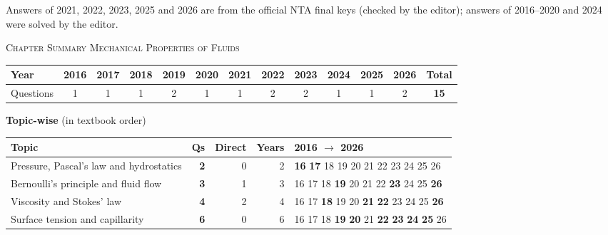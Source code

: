 {\footnotesize Answers of 2021, 2022, 2023, 2025 and 2026 are from the official NTA final keys (checked by the editor); answers of 2016--2020 and 2024 were solved by the editor.
}\par
\par{}\vspace{14pt}
\begin{center}{}\par
{\large\color{navy}\scshape Chapter Summary \textperiodcentered{} Mechanical Properties of Fluids}\end{center}
{\small\setlength{\tabcolsep}{3.5pt}
\begin{tabular*}{\linewidth}{@{\extracolsep{\fill}}l*{11}{c}c@{}}\toprule
Year & 2016 & 2017 & 2018 & 2019 & 2020 & 2021 & 2022 & 2023 & 2024 & 2025 & 2026 & Total\\\midrule
Questions & 1 & 1 & 1 & 2 & 1 & 1 & 2 & 2 & 1 & 1 & 2 & \textbf{15}\\\bottomrule\end{tabular*}}\par\medskip
{\small\textbf{\color{crimson}Topic-wise} (in textbook order)\par\smallskip
\begin{tabularx}{\linewidth}{@{}>{\raggedright\arraybackslash}Xrrrl@{}}\toprule
Topic & Qs & Direct & Years & 2016 $\rightarrow$ 2026\\\midrule
Pressure, Pascal's law and hydrostatics & \textbf{2} & 0 & 2 & {\scriptsize \textbf{16} \textbf{17} {\color{gray!45}18} {\color{gray!45}19} {\color{gray!45}20} {\color{gray!45}21} {\color{gray!45}22} {\color{gray!45}23} {\color{gray!45}24} {\color{gray!45}25} {\color{gray!45}26}}\\
Bernoulli's principle and fluid flow & \textbf{3} & 1 & 3 & {\scriptsize {\color{gray!45}16} {\color{gray!45}17} {\color{gray!45}18} \textbf{19} {\color{gray!45}20} {\color{gray!45}21} {\color{gray!45}22} \textbf{23} {\color{gray!45}24} {\color{gray!45}25} \textbf{26}}\\
Viscosity and Stokes' law & \textbf{4} & 2 & 4 & {\scriptsize {\color{gray!45}16} {\color{gray!45}17} \textbf{18} {\color{gray!45}19} {\color{gray!45}20} \textbf{21} \textbf{22} {\color{gray!45}23} {\color{gray!45}24} {\color{gray!45}25} \textbf{26}}\\
Surface tension and capillarity & \textbf{6} & 0 & 6 & {\scriptsize {\color{gray!45}16} {\color{gray!45}17} {\color{gray!45}18} \textbf{19} \textbf{20} {\color{gray!45}21} \textbf{22} \textbf{23} \textbf{24} \textbf{25} {\color{gray!45}26}}\\
\bottomrule\end{tabularx}}\par\medskip

